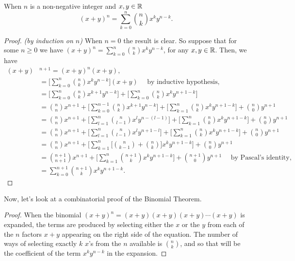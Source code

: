 \begin{thm} When $n$ is a non-negative integer and $x,y\in \mathbb{R}$
\[
(x+y)^n=\sum_{k=0}^n {n\choose k} x^k y^{n-k}.
\]
\end{thm}
\begin{proof}{\itshape (by induction on $n$)} When $n=0$ the result is clear. So suppose that for some
$n\geq 0$ we have $\displaystyle{(x+y)^n=\sum_{k=0}^n {n\choose k}x^k y^{n-k}}$, for any $x,y\in \mathbb{R}$. Then, we have 
\begin{align*}
 (x+y)&^{n+1} =(x+y)^n(x+y), \\
 & = \Big[\sum_{k=0}^n {n\choose k} x^k y^{n-k} \Big](x+y) \quad {\text{~by~inductive~hypothesis}}, \\
 & = \Big[\sum_{k=0}^n {n\choose k} x^{k+1} y^{n-k}\Big]+\Big[\sum_{k=0}^n {n\choose k} x^k y^{n+1-k}\Big] \\
 & = {n\choose n} x^{n+1} + \Big[\sum_{k=0}^{n-1} {n\choose k} x^{k+1} y^{n-k}\Big] + \Big[\sum_{k=1}^n {n\choose k} x^k y^{n+1-k}\Big]+
 {n\choose 0}y^{n+1} \\
 & = {n\choose n} x^{n+1} + \Big[\sum_{l=1}^{n} {n\choose l-1} x^l y^{n-(l-1)}\Big] + \Big[\sum_{k=1}^n {n\choose k} x^k y^{n+1-k}\Big]+
 {n\choose 0}y^{n+1} \\
 & = {n\choose n} x^{n+1} + \Big[\sum_{l=1}^{n} {n\choose l-1} x^l y^{n+1-l}\Big] + \Big[\sum_{k=1}^n {n\choose k} x^k y^{n+1-k}\Big]+
 {n\choose 0}y^{n+1} \\
 & = {n\choose n} x^{n+1} + \Big[\sum_{k=1}^{n} \Big[{n\choose k-1} + {n\choose k}\Big] x^k y^{n+1-k}\Big]+ {n\choose 0}y^{n+1} \\
 & = {n+1\choose n+1} x^{n+1} + \Big[\sum_{k=1}^{n} {n+1\choose k} x^k y^{n+1-k}\Big]+ {n+1\choose 0}y^{n+1} \quad
 {\text{ by~Pascal's~identity}}, \\
 &= \sum_{k=0}^{n+1} {n+1\choose k} x^k y^{n+1-k}.
 \end{align*}
\end{proof}

\clearpage
Now, let's look at a combinatorial proof of the Binomial Theorem. 
\begin{proof}
 When the binomial
 $
 (x+y)^n = (x+y)(x+y)(x+y)\cdots(x+y)
 $
 is expanded, the terms are produced by selecting either the $x$ or the $y$ from each
 of the $n$ factors $x+y$ appearing on the right side of the equation. The number of 
 ways of selecting exactly $k$ $x$'s from the $n$ available is $\displaystyle {n\choose k}$, and
 so that will be the coefficient of the term $x^ky^{n-k}$ in the expansion.
\end{proof}

